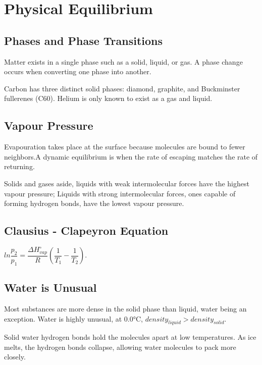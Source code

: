 \documentclass[a4paper,12pt]{article}
\begin{document}
\newpage
\section{Physical Equilibrium}
\subsection{Phases and Phase Transitions}
Matter exists in a single phase such as a solid, liquid, or gas. A phase change occurs when converting one phase into another.\par
Carbon has three distinct solid phases: diamond, graphite, and Buckminster fullerenes (C60). Helium is only known to exist as a gas and liquid.
\subsection{Vapour Pressure}
Evapouration takes place at the surface because molecules are bound to fewer neighbors.A dynamic equilibrium is when the rate of escaping matches the rate of returning.\par
Solids and gases aside, liquids with weak intermolecular forces have the highest vapour pressure; Liquids with strong intermolecular forces, ones capable of forming hydrogen bonds, have the lowest vapour pressure.
\subsection{Clausius - Clapeyron Equation}
$ln\dfrac{p_{2}}{p_{1}}=\dfrac{\Delta H_{vap}^{\circ}}{R}(\dfrac{1}{T_{1}}-\dfrac{1}{T_{2}})$.
\subsection{Water is Unusual}
Most substances are more dense in the solid phase than liquid, water being an exception. Water is highly unusual, at 0.0°C,  $density_{liquid} > density_{solid}$.\par
Solid water hydrogen bonds hold the molecules apart at low temperatures. As ice melts, the hydrogen bonds collapse, allowing water molecules to pack more closely.
\end{document}
